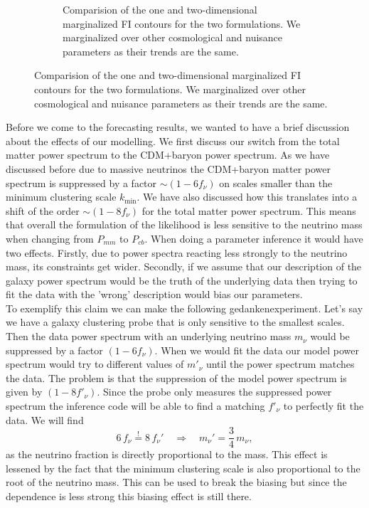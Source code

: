 \documentclass[oneside]{book}
\begin{document}
\begin{figure}
\begin{subfigure}[b]{0.70\textwidth}
        \caption{Comparision of the one and two-dimensional marginalized FI contours for the two formulations. We marginalized over other cosmological and nuisance parameters as their trends are the same.}
        \label{fig:trianglePcbVPmm}
    \end{subfigure}
       \label{fig:PcbVPmm} 
\end{figure}
Before we come to the forecasting results, we wanted to have a brief discussion about the effects of our modelling. We first discuss our switch from the total matter power spectrum to the CDM+baryon power spectrum. As we have discussed before due to massive neutrinos the CDM+baryon matter power spectrum is suppressed by a factor $\sim(1-6f_\nu)$ on scales smaller than the minimum clustering scale $k_\mathrm{min}$. We have also discussed how this translates into a shift of the order $\sim(1-8f_\nu)$ for the total matter power spectrum. This means that overall the formulation of the likelihood is less sensitive to the neutrino mass when changing from $P_{mm}$ to $P_{cb}$. When doing a parameter inference it would have two effects. Firstly, due to power spectra reacting less strongly to the neutrino mass, its constraints get wider. Secondly, if we assume that our description of the galaxy power spectrum would be the truth of the underlying data then trying to fit the data with the 'wrong' description would bias our parameters.\\
To exemplify this claim we can make the following gedankenexperiment. Let's say we have a galaxy clustering probe that is only sensitive to the smallest scales. Then the data power spectrum with an underlying neutrino mass $m_\nu$ would be suppressed by a factor $(1-6f_\nu)$. When we would fit the data our model power spectrum would try to different values of $m'_\nu$ until the power spectrum matches the data. The problem is that the suppression of the model power spectrum is given by $(1-8f'_\nu)$. Since the probe only measures the suppressed power spectrum the inference code will be able to find a matching $f'_\nu$ to perfectly fit the data. We will find \begin{equation}
    6\,f_\nu \overset{!}{=} 8\,f_\nu' \quad\Longrightarrow\quad m_\nu' = \frac{3}{4}\, m_\nu,
\end{equation}
as the neutrino fraction is directly proportional to the mass. This effect is lessened by the fact that the minimum clustering scale is also proportional to the root of the neutrino mass. This can be used to break the biasing but since the dependence is less strong this biasing effect is still there.\\
\end{document}
